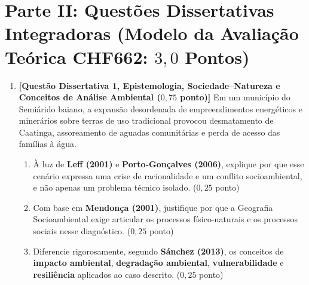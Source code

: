 \section*{Parte II: Questões Dissertativas Integradoras (Modelo da Avaliação Teórica CHF662: $3{,}0$ Pontos)}

\begin{enumerate}[leftmargin=1.8em, itemsep=6pt, resume]
  \item \textbf{[Questão Dissertativa 1, Epistemologia, Sociedade--Natureza e Conceitos de Análise Ambiental ($0{,}75$ ponto)]}
  Em um município do Semiárido baiano, a expansão desordenada de empreendimentos energéticos e minerários sobre terras de uso tradicional provocou desmatamento de Caatinga, assoreamento de aguadas comunitárias e perda de acesso das famílias à água.
  \begin{enumerate}[label=(\alph*), leftmargin=1.8em, itemsep=2pt]
    \item À luz de \textbf{Leff (2001)} e \textbf{Porto-Gonçalves (2006)}, explique por que esse cenário expressa uma crise de racionalidade e um conflito socioambiental, e não apenas um problema técnico isolado. ($0{,}25$ ponto)
    \item Com base em \textbf{Mendonça (2001)}, justifique por que a Geografia Socioambiental exige articular os processos físico-naturais e os processos sociais nesse diagnóstico. ($0{,}25$ ponto)
    \item Diferencie rigorosamente, segundo \textbf{Sánchez (2013)}, os conceitos de \textbf{impacto ambiental}, \textbf{degradação ambiental}, \textbf{vulnerabilidade} e \textbf{resiliência} aplicados ao caso descrito. ($0{,}25$ ponto)
  \end{enumerate}
  \espacoResolucao[3.6cm]


\end{enumerate}
